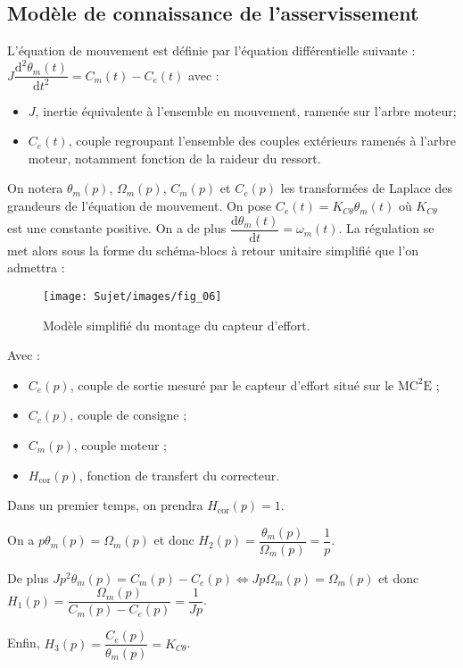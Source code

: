 \fi


\subsection*{Modèle de connaissance de l'asservissement}
\ifprof
\else
L’équation de mouvement est définie par l’équation différentielle suivante : 
$J\dfrac{\text{d}^2\theta_m(t)}{\text{d}t^2}=C_m(t)-C_e(t)$  avec :
\begin{itemize}
\item $J$, inertie équivalente à l’ensemble en mouvement, ramenée sur l’arbre moteur;
\item $C_e(t)$, couple regroupant l’ensemble des couples extérieurs ramenés à l’arbre moteur, notamment fonction de la raideur du ressort.
\end{itemize}


On notera $\theta_m(p)$, $\Omega_m(p)$, $C_m(p)$ et $C_e(p)$ les transformées de Laplace des grandeurs de l’équation de mouvement.
On pose $C_e(t)=K_{C\theta}\theta_m(t)$ où  $K_{C\theta}$ est une constante positive. On a de plus $\dfrac{\text{d}\theta_m(t)}{\text{d}t}=\omega_m(t)$. La régulation se met alors sous la forme du schéma-blocs à retour unitaire simplifié que l’on
admettra :

\begin{figure}[!h]
\centering
\texttt{[image: Sujet/images/fig\_06]}

\caption{Modèle simplifié du montage du capteur d’effort.}
\end{figure}

Avec :
\begin{itemize}
\item $C_e(p)$, couple de sortie mesuré par le capteur d’effort situé sur le $\text{MC}^2\text{E}$ ;
\item $C_c(p)$, couple de consigne ;
\item $C_m(p)$, couple moteur ;
\item $H_{\text{cor}}(p)$, fonction de transfert du correcteur.
\end{itemize}
Dans un premier temps, on prendra $H_{\text{cor}}(p)=1$.

\fi
{}
\ifprof
\begin{corrige}
On a $p\theta_m(p)=\Omega_m(p)$ et donc $H_2(p)=\dfrac{\theta_m(p)}{\Omega_m(p)}=\dfrac{1}{p}$.

De plus $Jp^2 \theta_m(p) = C_m(p)-C_e(p) \Leftrightarrow Jp\Omega_m(p) = \Omega_m(p)$ et donc $H_1(p)=\dfrac{\Omega_m(p)}{C_m(p)-C_e(p)}=\dfrac{1}{Jp}$.

Enfin, $H_3(p)=\dfrac{C_e(p)}{\theta_m(p)}=K_{C\theta}$.

\end{corrige}
\else
\fi

